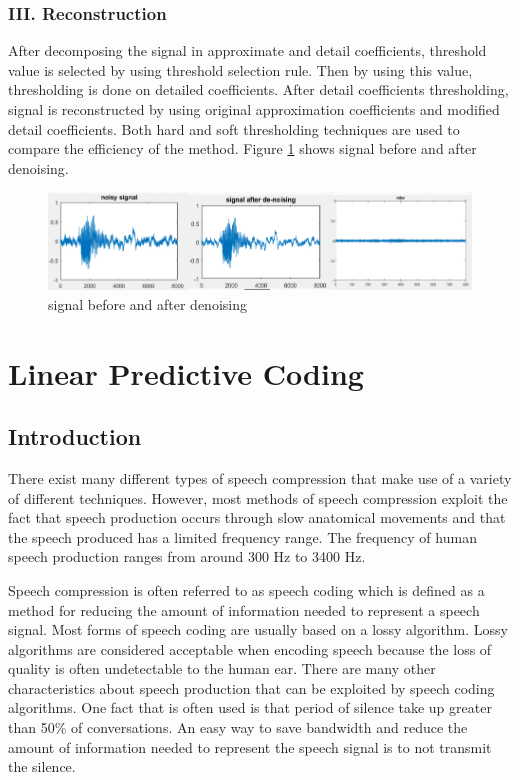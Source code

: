 \documentclass[12pt, a4paper, twoside]{report}
\begin{document}
\subsubsection{III. Reconstruction}
After  decomposing  the  signal  in approximate  and  detail  coefficients, threshold  value  is  selected  by  using threshold  selection  rule.  Then  by  using this  value,  thresholding  is  done  on detailed  coefficients.  After  detail coefficients  thresholding,  signal  is reconstructed  by  using  original approximation  coefficients  and  modified detail  coefficients.  Both hard and soft thresholding techniques are used   to compare the efficiency of the method. Figure \ref{fig:denoised-signal-dwt} shows signal before and after denoising.
\begin{figure}[!h]
	\centering
	\includegraphics[width=1\textwidth]
	{images/chapter3/comp-noisy-sig}
	\caption{signal before and after denoising}
	\label{fig:denoised-signal-dwt}
\end{figure}


\section{Linear Predictive Coding}
\subsection{Introduction}
There exist many different types of speech compression that make use of a variety of different techniques. However, most methods of speech compression exploit the fact that speech production occurs through slow anatomical movements and that the speech produced has a limited frequency range. The frequency of human speech production ranges from around 300 Hz to 3400 Hz.

Speech compression is often referred to as speech coding which is defined as a method for reducing the amount of information needed to represent a speech signal. Most forms of speech coding are usually based on a lossy algorithm. Lossy algorithms are considered acceptable when encoding speech because the loss of quality is often undetectable to the human ear. There are many other characteristics about speech production that can be exploited by speech coding algorithms. One fact that is often used is that period of silence take up greater than 50\% of conversations. An easy way to save bandwidth and reduce the amount of information needed to represent the speech signal is to not transmit the silence.
\end{document}
